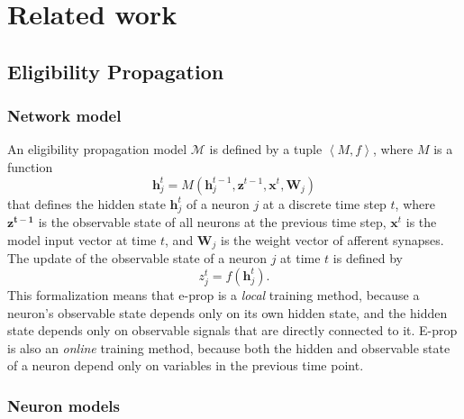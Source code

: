 \chapter{Related work}\label{ch:relatedwork}

\section{Eligibility Propagation}

    \subsection{Network model}
        An eligibility propagation model $\mathcal{M}$ is defined by a tuple $\left<M, f\right>$,
        where $M$ is a function
        \begin{equation}\label{eq:model}
        \mathbf{h}^t_j = M\left(\mathbf{h}_j^{t-1}, \mathbf{z}^{t-1}, \mathbf{x}^t, \mathbf{W}_j\right)
        \end{equation}
        that defines the hidden state $\mathbf{h}_j^t$ of a neuron $j$ at a discrete time step $t$, where $\mathbf{z^{t-1}}$ is the observable state of all neurons at the previous time step, $\mathbf{x}^t$ is the model input vector at time $t$, and $\mathbf{W}_j$ is the weight vector of afferent synapses.
        The update of the observable state of a neuron $j$ at time $t$ is defined by
        \begin{equation}
        z^t_j = f\left(\mathbf{h}_j^t\right).
        \end{equation}
        This formalization means that e-prop is a \emph{local} training method, because a neuron's observable state depends only on its own hidden state, and the hidden state depends only on observable signals that are directly connected to it.
        E-prop is also an \emph{online} training method, because both the hidden and observable state of a neuron depend only on variables in the previous time point.

    \subsection{Neuron models}\label{sec:alif}

